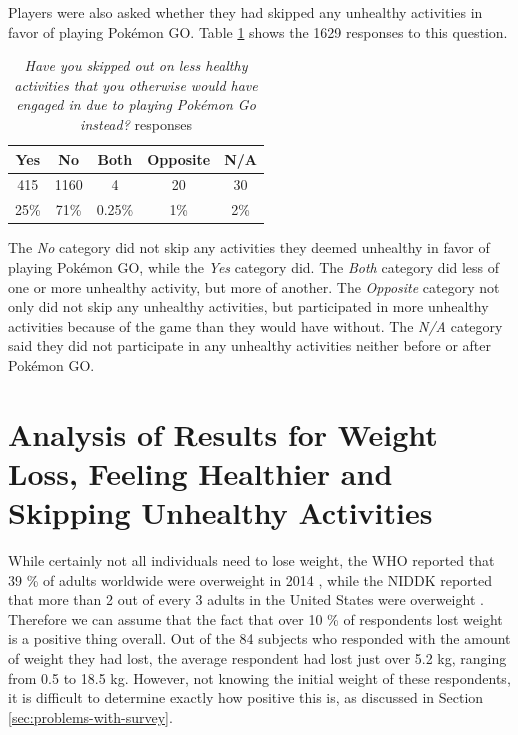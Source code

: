 Players were also asked whether they had skipped any unhealthy activities in favor of playing Pokémon GO. Table \ref{tbl:skipping-unhealthy-activities} shows the 1629 responses to this question.

\begin{table}[h]
	\centering
	\caption{\emph{Have you skipped out on less healthy activities that you otherwise would have engaged in due to playing Pokémon Go instead?} responses}
	\label{tbl:skipping-unhealthy-activities}
	\begin{tabular}{|c|c|c|c|c|}
		\hline
		\textbf{Yes} & \textbf{No} & \textbf{Both} & \textbf{Opposite} & \textbf{N/A}\\
		\hline\hline
		415		& 1160	& 4		& 20	& 30\\
		25\%	& 71\%	& 0.25\%& 1\%	& 2\%\\\hline
	\end{tabular}
\end{table}

The \emph{No} category did not skip any activities they deemed unhealthy in favor of playing Pokémon GO, while the \emph{Yes} category did. The \emph{Both} category did less of one or more unhealthy activity, but more of another. The \emph{Opposite} category not only did not skip any unhealthy activities, but participated in more unhealthy activities because of the game than they would have without. The \emph{N/A} category said they did not participate in any unhealthy activities neither before or after Pokémon GO.

\section{Analysis of Results for Weight Loss, Feeling Healthier and Skipping Unhealthy Activities}

While certainly not all individuals need to lose weight, the WHO reported that 39 \% of adults worldwide were overweight in 2014 \cite{WHOobesity}, while the NIDDK reported that more than 2 out of every 3 adults in the United States were overweight \cite{NIDDKoverweight}. Therefore we can assume that the fact that over 10 \% of respondents lost weight is a positive thing overall. Out of the 84 subjects who responded with the amount of weight they had lost, the average respondent had lost just over 5.2 kg, ranging from 0.5 to 18.5 kg. However, not knowing the initial weight of these respondents, it is difficult to determine exactly how positive this is, as discussed in Section \ref{sec:problems-with-survey}.

